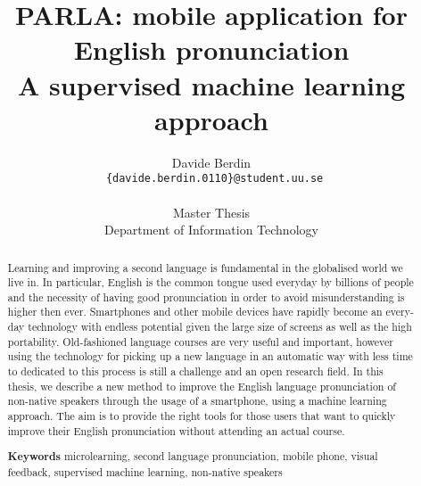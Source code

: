 \documentclass{report}
\title{PARLA: mobile application for English pronunciation \\ A supervised machine learning approach}
\author{Davide Berdin \\
  \texttt{ \{davide.berdin.0110\}@student.uu.se} \\
  \\ Master Thesis
  \\ Department of Information Technology}
\newcommand\blankpage{%
    \null
    \thispagestyle{empty}%
    \addtocounter{page}{-1}%
    \newpage}
\begin{document}
\maketitle


\blankpage

\blankpage

\begin{abstract}
Learning and improving a second language is fundamental in the globalised world we live in. In particular, English is the common tongue used everyday by billions of people and the necessity of having good pronunciation in order to avoid misunderstanding is higher then ever. Smartphones and other mobile devices have rapidly become an every-day technology with endless potential given the large size of screens as well as the high portability. Old-fashioned language courses are very useful and important, however using the technology for picking up a new language in an automatic way with less time to dedicated to this process is still a challenge and an open research field. In this thesis, we describe a new method to improve the English language pronunciation of non-native speakers through the usage of a smartphone, using a machine learning approach. The aim is to provide the right tools for those users that want to quickly improve their English pronunciation without attending an actual course. \vspace{7in}


\noindent \textbf{Keywords} microlearning, second language pronunciation, mobile phone, visual feedback, supervised machine learning, non-native speakers
\end{abstract}

\blankpage
\end{document}
